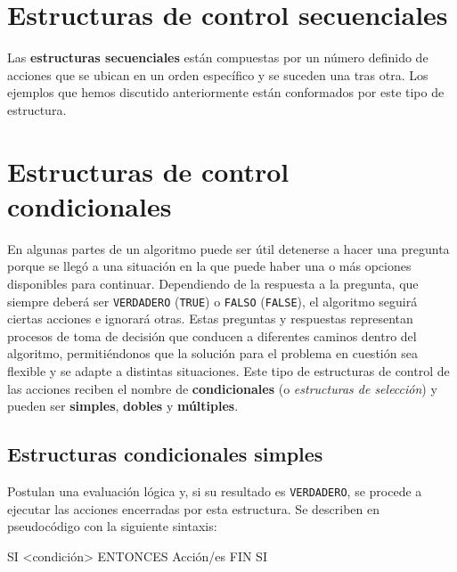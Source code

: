 \documentclass[
]{book}
\newenvironment{Shaded}{\begin{snugshade}}{\end{snugshade}}
\newcommand{\NormalTok}[1]{#1}
\begin{document}
\hypertarget{estructuras-de-control-secuenciales}{%
\section{Estructuras de control secuenciales}\label{estructuras-de-control-secuenciales}}

Las \textbf{estructuras secuenciales} están compuestas por un número definido de acciones que se ubican en un orden específico y se suceden una tras otra. Los ejemplos que hemos discutido anteriormente están conformados por este tipo de estructura.

\hypertarget{estructuras-de-control-condicionales}{%
\section{Estructuras de control condicionales}\label{estructuras-de-control-condicionales}}

En algunas partes de un algoritmo puede ser útil detenerse a hacer una pregunta porque se llegó a una situación en la que puede haber una o más opciones disponibles para continuar. Dependiendo de la respuesta a la pregunta, que siempre deberá ser \texttt{VERDADERO} (\texttt{TRUE}) o \texttt{FALSO} (\texttt{FALSE}), el algoritmo seguirá ciertas acciones e ignorará otras. Estas preguntas y respuestas representan procesos de toma de decisión que conducen a diferentes caminos dentro del algoritmo, permitiéndonos que la solución para el problema en cuestión sea flexible y se adapte a distintas situaciones. Este tipo de estructuras de control de las acciones reciben el nombre de \textbf{condicionales} (o \emph{estructuras de selección}) y pueden ser \textbf{simples}, \textbf{dobles} y \textbf{múltiples}.

\hypertarget{estructuras-condicionales-simples}{%
\subsection{Estructuras condicionales simples}\label{estructuras-condicionales-simples}}

Postulan una evaluación lógica y, si su resultado es \texttt{VERDADERO}, se procede a ejecutar las acciones encerradas por esta estructura. Se describen en pseudocódigo con la siguiente sintaxis:

\begin{Shaded}
\begin{Highlighting}[]
\NormalTok{SI \textless{}condición\textgreater{} ENTONCES}
\NormalTok{    Acción/es}
\NormalTok{FIN SI}
\end{Highlighting}
\end{Shaded}
\end{document}
